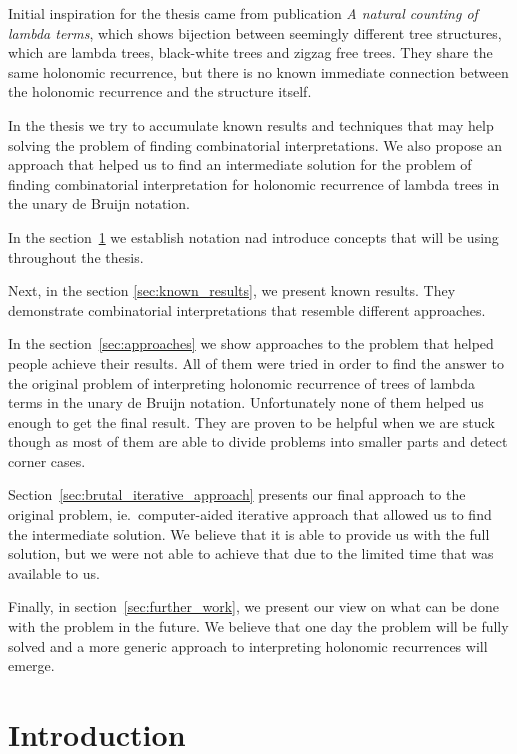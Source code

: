 \documentclass[final]{article}
\theoremstyle{definition}
\theoremstyle{remark}
\begin{document}
Initial inspiration for the thesis came from publication \textit{A natural counting of lambda terms}\cite{zigzag}, which shows bijection between seemingly different tree structures, which are lambda trees, black-white trees and zigzag free trees. They share the same holonomic recurrence, but there is no known immediate connection between the holonomic recurrence and the structure itself.

In the thesis we try to accumulate known results and techniques that may help solving the problem of finding combinatorial interpretations. We also propose an approach that helped us to find an intermediate solution for the problem of finding combinatorial interpretation for holonomic recurrence of lambda trees in the unary de Bruijn notation.

In the section\ \ref{sec:introduction} we establish notation nad introduce concepts that will be using throughout the thesis.

Next, in the section \ref{sec:known_results}, we present known results. They demonstrate combinatorial interpretations that resemble different approaches.

In the section\ \ref{sec:approaches} we show approaches to the problem that helped people achieve their results. All of them were tried in order to find the answer to the original problem of interpreting holonomic recurrence of trees of lambda terms in the unary de Bruijn notation. Unfortunately none of them helped us enough to get the final result. They are proven to be helpful when we are stuck though as most of them are able to divide problems into smaller parts and detect corner cases.

Section\ \ref{sec:brutal_iterative_approach} presents our final approach to the original problem, ie.\ computer-aided iterative approach that allowed us to find the intermediate solution. We believe that it is able to provide us with the full solution, but we were not able to achieve that due to the limited time that was available to us.

Finally, in section\ \ref{sec:further_work}, we present our view on what can be done with the problem in the future. We believe that one day the problem will be fully solved and a more generic approach to interpreting holonomic recurrences will emerge.

\clearpage

\section{Introduction}%
\label{sec:introduction}
\end{document}
